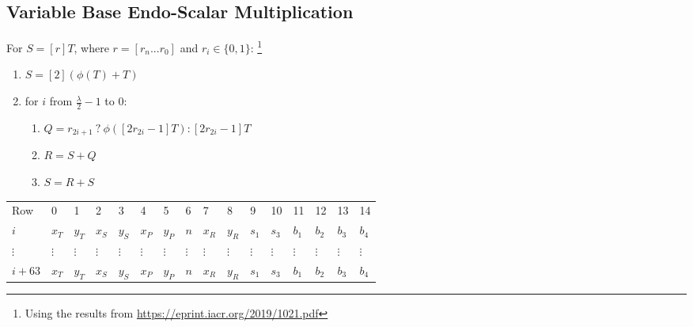 \subsection{Variable Base Endo-Scalar Multiplication}

For $S  = [r]T$, where $r = [r_n ... r_0]$ and $r_i \in \{0, 1\}$:
\footnote{Using the results from \url{https://eprint.iacr.org/2019/1021.pdf}}
\begin{enumerate}
    \item $S = [2](\phi(T) + T)$
    \item for $i$ from $\frac{\lambda}{2} - 1$ to $0$:
    \begin{enumerate}
        \item $Q = r_{2i + 1} \: ? \: \phi([2r_{2i} - 1]T) : [2r_{2i} - 1]T$
        \item $R = S + Q$
        \item $S = R + S$
    \end{enumerate}
\end{enumerate}

\begin{center}
    \begin{table}[H]
        \begin{tabular}{llllllllllllllll}
            Row    & 0        & 1        & 2        & 3        & 4        & 5        & 6        & 7        & 8        & 9        & 10       & 11       & 12       & 13       & 14       \\
            $i$   & $x_T$    & $y_T$    & $x_S$    & $y_S$    & $x_P$    & $y_P$    & $n$      & $x_R$    & $y_R$    & $s_1$    & $s_3$    & $b_1$    & $b_2$ & $b_3$ & $b_4$ \\
            $\vdots$ & $\vdots$ & $\vdots$ & $\vdots$ & $\vdots$ & $\vdots$ & $\vdots$ & $\vdots$ & $\vdots$ & $\vdots$ & $\vdots$ & $\vdots$ & $\vdots$ & $\vdots$ & $\vdots$ & $\vdots$ \\
            $i + 63$ &  $x_T$    & $y_T$    & $x_S$    & $y_S$    & $x_P$    & $y_P$    & $n$      & $x_R$    & $y_R$    & $s_1$    & $s_3$    & $b_1$    & $b_2$ & $b_3$ & $b_4$ \\
        \end{tabular}
    \end{table}
\end{center}

